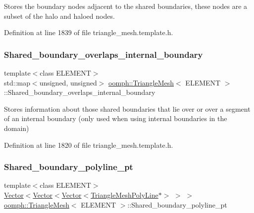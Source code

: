 Stores the boundary nodes adjacent to the shared boundaries, these nodes are a subset of the halo and haloed nodes. 



Definition at line 1839 of file triangle\+\_\+mesh.\+template.\+h.

\mbox{\label{classoomph_1_1TriangleMesh_a1ac1fe24d9985f3e778b1362f00d2949}} 
\subsubsection{\texorpdfstring{Shared\+\_\+boundary\+\_\+overlaps\+\_\+internal\+\_\+boundary}{Shared\_boundary\_overlaps\_internal\_boundary}}
{\footnotesize\ttfamily template$<$class E\+L\+E\+M\+E\+NT$>$ \\
std\+::map$<$unsigned, unsigned$>$ \hyperlink{classoomph_1_1TriangleMesh}{oomph\+::\+Triangle\+Mesh}$<$ E\+L\+E\+M\+E\+NT $>$\+::Shared\+\_\+boundary\+\_\+overlaps\+\_\+internal\+\_\+boundary\hspace{0.3cm}{\ttfamily [protected]}}



Stores information about those shared boundaries that lie over or over a segment of an internal boundary (only used when using internal boundaries in the domain) 



Definition at line 1820 of file triangle\+\_\+mesh.\+template.\+h.

\mbox{\label{classoomph_1_1TriangleMesh_a88ca952f5e86d5cf5215811600ce6f0b}} 
\subsubsection{\texorpdfstring{Shared\+\_\+boundary\+\_\+polyline\+\_\+pt}{Shared\_boundary\_polyline\_pt}}
{\footnotesize\ttfamily template$<$class E\+L\+E\+M\+E\+NT$>$ \\
\hyperlink{classoomph_1_1Vector}{Vector}$<$\hyperlink{classoomph_1_1Vector}{Vector}$<$\hyperlink{classoomph_1_1Vector}{Vector}$<$\hyperlink{classoomph_1_1TriangleMeshPolyLine}{Triangle\+Mesh\+Poly\+Line}$\ast$$>$ $>$ $>$ \hyperlink{classoomph_1_1TriangleMesh}{oomph\+::\+Triangle\+Mesh}$<$ E\+L\+E\+M\+E\+NT $>$\+::Shared\+\_\+boundary\+\_\+polyline\+\_\+pt\hspace{0.3cm}{\ttfamily [protected]}}




